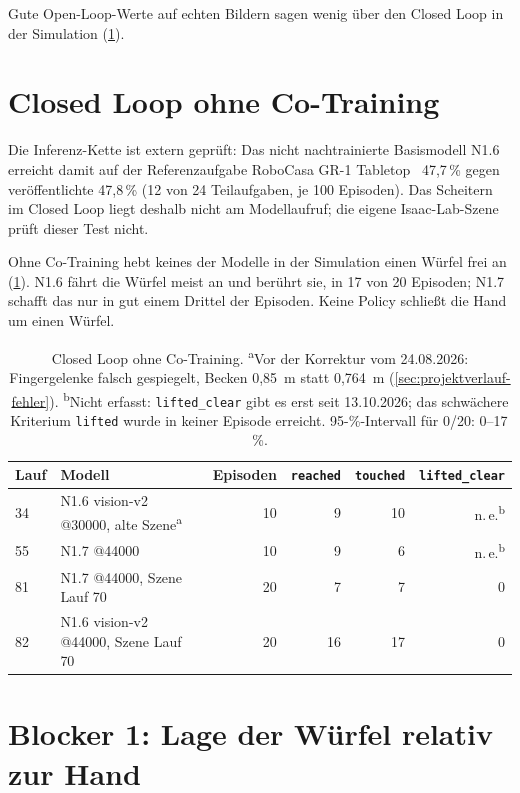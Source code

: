 Gute Open-Loop-Werte auf echten Bildern sagen wenig über den Closed Loop in der Simulation
(\cref{sec:erg-closed-loop}).

\section{Closed Loop ohne Co-Training}
\label{sec:erg-closed-loop}
\label{sec:closed-loop-ergebnis}
\label{sec:realperformance}

Die Inferenz-Kette ist extern geprüft: Das nicht nachtrainierte Basismodell N1.6 erreicht damit auf der
Referenzaufgabe RoboCasa GR-1 Tabletop~\cite{robocasa2024} 47,7\,\% gegen veröffentlichte
47,8\,\% (12 von 24 Teilaufgaben, je 100 Episoden). Das Scheitern im Closed Loop liegt deshalb
nicht am Modellaufruf; die eigene Isaac-Lab-Szene prüft dieser Test nicht.

Ohne Co-Training hebt keines der Modelle in der Simulation einen Würfel frei an
(\cref{tab:cl-ohne}). N1.6 fährt die Würfel meist an und berührt sie, in 17 von 20 Episoden;
N1.7 schafft das nur in gut einem Drittel der Episoden. Keine Policy schließt die Hand um einen
Würfel.

\begin{table}[htb]
  \centering
  \begin{tabular}{llrrrr}
    \toprule
    Lauf & Modell & Episoden & \texttt{reached} & \texttt{touched} & \texttt{lifted\_clear} \\
    \midrule
    34 & N1.6 vision-v2 @30000, alte Szene\textsuperscript{a} & 10 & 9 & 10 & n.\,e.\textsuperscript{b} \\
    55 & N1.7 @44000 & 10 & 9 & 6 & n.\,e.\textsuperscript{b} \\
    81 & N1.7 @44000, Szene Lauf 70 & 20 & 7 & 7 & 0 \\
    82 & N1.6 vision-v2 @44000, Szene Lauf 70 & 20 & 16 & 17 & 0 \\
    \bottomrule
  \end{tabular}
  \caption[Closed Loop ohne Co-Training]{Closed Loop ohne Co-Training. \textsuperscript{a}Vor der Korrektur vom 24.08.2026:
    Fingergelenke falsch gespiegelt, Becken 0,85~m statt 0,764~m (\cref{sec:projektverlauf-fehler}).
    \textsuperscript{b}Nicht erfasst: \texttt{lifted\_clear} gibt es erst seit 13.10.2026; das schwächere Kriterium \texttt{lifted} wurde in keiner Episode erreicht.
    95-\%-Intervall für 0/20: 0--17\,\%.}
  \label{tab:cl-ohne}
\end{table}

\section{Blocker 1: Lage der Würfel relativ zur Hand}
\label{sec:erg-registrierung}
\label{sec:geometrie}
\label{sec:wuerfellage}

